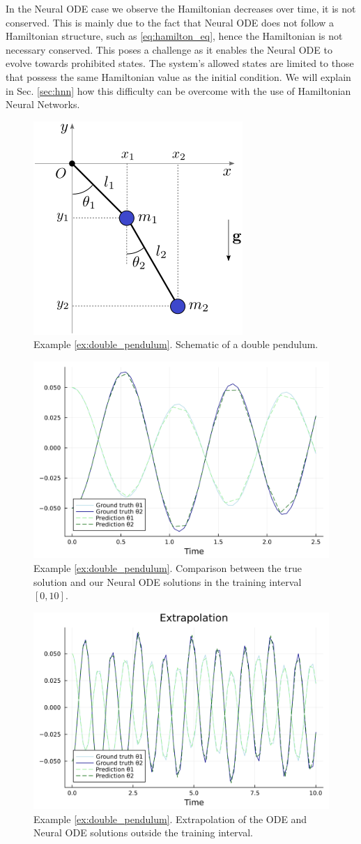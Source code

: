 \documentclass[final,onefignum,onetabnum]{siamart220329}
\newcounter{example}
\begin{document}
In the Neural ODE case we observe the Hamiltonian decreases over time, it is not conserved. This is mainly due to the fact that Neural ODE does not follow a Hamiltonian structure, such as \ref{eq:hamilton_eq}, hence the Hamiltonian is not necessary conserved. This poses a challenge as it enables the Neural ODE to evolve towards prohibited states. The system's allowed states are limited to those that possess the same Hamiltonian value as the initial condition. We will explain in Sec. \ref{sec:hnn} how this difficulty can be overcome with the use of Hamiltonian Neural Networks.

\begin{figure}[h!]
	\centering
	\includegraphics[width=0.4\linewidth]{double-pendulum}
	\caption{Example \ref{ex:double_pendulum}. Schematic of a double pendulum.}
	\label{fig:double_pendulum}
\end{figure}

\begin{figure}[h!]
	\centering
	\includegraphics[width=0.5\linewidth]{../examples/double_pendulum/comparison}
	\caption{Example \ref{ex:double_pendulum}. Comparison between the true solution and our Neural ODE solutions in the training interval $[0,10]$.}
	\label{fig:double_pendulum_comparison}
\end{figure}

\begin{figure}[h!]
	\centering
	\includegraphics[width=0.5\linewidth]{../examples/double_pendulum/extrapolation}
	\caption{Example \ref{ex:double_pendulum}. Extrapolation of the ODE and Neural ODE solutions outside the training interval.}
	\label{fig:double_pendulum_extrapolation}
\end{figure}
\end{document}
